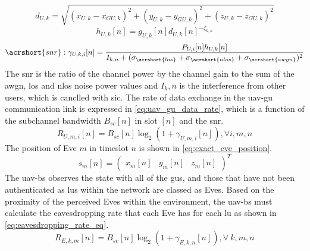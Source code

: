 \begin{equation} \label{eq:distance_uav_gu}
    d_{U, k} = \sqrt{(x_{U, k}-x_{GU, k})^2 + (y_{U, k}-y_{GU, k})^2 + (z_{U, k}-z_{GU, k})^2}
\end{equation}
\begin{equation} \label{eq:channel_gain_uav_gu}
    h_{U, k} [n] = g_{U, k} [n] d_{U, k} [n]^{-\zeta_{k, n}}
\end{equation} 
\begin{equation} \label{eq:snr_uav_gu}
    \acrshort{snr}: \gamma_{U, k, i} [n] = \frac{P_{U, i}[n] h_{U, k}[n]}{I_{k, n} + (\sigma_{\acrshort{los}} + \sigma_{\acrshort{nlos}} + \sigma_{\acrshort{awgn}})^{2}}
\end{equation} 
The \acrshort{snr} is the ratio of the channel power by the channel gain to the sum of the \acrshort{awgn}, \acrshort{los} and \acrshort{nlos} noise power values and $I_k, n$ is the interference from other users, which is canclled with \acrshort{sic}. 
The rate of data exchange in the \acrshort{uav}-\acrshort{gu} communication link is expressed in \ref{eq:uav_gu_data_rate}, which is a function of the subchannel bandwidth $B_{sc} [n]$ in slot $[n]$ and the \acrshort{snr}. 
\begin{equation} \label{eq:uav_gu_data_rate}
    R_{U, m, i} [n] = B_{sc}[n] \log_{2} (1 + \gamma_{U, m, i}[n]), \forall i, m, n
\end{equation} 
The position of Eve $m$ in timeslot $n$ is shown in \ref{eq:exact_eve_position}. 
\begin{equation} \label{eq:exact_eve_position}
    s_{m} [n] = \begin{pmatrix}
        x_{m} [n] & y_{m} [n] & z_{m} [n]
    \end{pmatrix} ^{T}
\end{equation}
The \acrshort{uav}-\acrshort{bs} observes the state with all of the \acrshort{gu}s, and those that have not been authenticated as \acrshort{lu}s within the network are classed as Eves. 
Based on the proximity of the perceived Eves within the environment, the \acrshort{uav}-\acrshort{bs} must calculate the eavesdropping rate that each Eve has for each \acrshort{lu} as shown in \ref{eq:eavesdropping_rate_eq}. 
\begin{equation} \label{eq:eavesdropping_rate_eq}
   R_{E, k, m} [n] = B_{sc} [n] \log_{2} (1 + \gamma_{E, k, n} [n]), \forall \ k, m, n
\end{equation}
